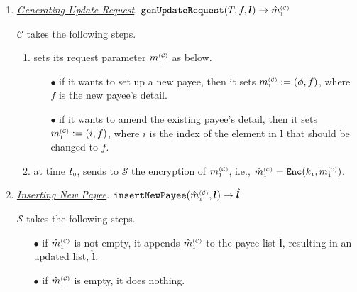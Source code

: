 \begin{enumerate}
\item\label{genUpdateRequest} \underline{\textit{Generating  Update Request}}. $\mathtt{genUpdateRequest}(T, f, {\bm l})\rightarrow \hat m^{\scriptscriptstyle\mathcal{(C)}}_{\scriptscriptstyle 1}$

$\mathcal{C}$ takes the following steps. 

\begin{enumerate}
%
\item sets its request parameter $m_{\scriptscriptstyle 1}^{\scriptscriptstyle(\mathcal C)}$ as below. 
%
\begin{itemize}

\item[$\bullet$] if it wants to set up a new payee, then it sets $m_{\scriptscriptstyle 1}^{\scriptscriptstyle(\mathcal C)}:=(\phi,f)$, where $f$ is the new payee's detail.  %

%
\item[$\bullet$] if it wants to amend the existing payee's detail,  then it sets $m_{\scriptscriptstyle 1}^{\scriptscriptstyle(\mathcal C)}:=(i, f)$, where $i$ is the index of the element in $\bm l$ that should be changed to $f$.  %



\end{itemize}
\item\label{send-update-req} at time $t_{\scriptscriptstyle 0}$, sends to $\mathcal{S}$  the encryption of $m_{\scriptscriptstyle 1}^{\scriptscriptstyle(\mathcal C)}$, i.e., $\hat m_{\scriptscriptstyle 1}^{\scriptscriptstyle(\mathcal C)}=\mathtt{Enc}(\bar k_{\scriptscriptstyle 1}, m_{\scriptscriptstyle 1}^{\scriptscriptstyle(\mathcal C)})$. 
\end{enumerate}
%

 \item \underline{\textit{Inserting New Payee}}. $\mathtt{insertNewPayee}(\hat m^{\scriptscriptstyle\mathcal{(C)}}_{\scriptscriptstyle 1}, {\bm l})\rightarrow {\hat{\bm l}}$
 
$\mathcal{S}$ takes the following steps. 
 \begin{itemize}
 \item[$\bullet$] if $\hat m_{\scriptscriptstyle 1}^{\scriptscriptstyle(\mathcal C)}$  is not empty, it appends $\hat m_{\scriptscriptstyle 1}^{\scriptscriptstyle(\mathcal C)}$ to the payee list $\hat{\bm l}$, resulting in an updated list, $\hat{\bm l}$. 
  \item[$\bullet$] if $\hat m_{\scriptscriptstyle 1}^{\scriptscriptstyle(\mathcal C)}$ is empty,  it does nothing. 
 \end{itemize}
 

\end{enumerate}
